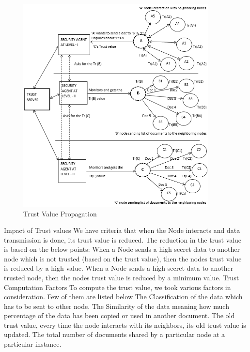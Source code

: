 \begin{figure}[h!]
    \label{fig:TrustTransmission}
    \begin{center}
        \includegraphics[width=0.90\textwidth]{Figures/Trust_Propagation_Diagram.PNG}
        \caption{Trust Value Propagation}
    \end{center}
\end{figure}


Impact of Trust values
We have criteria that when the Node interacts and data transmission is done, its trust value is reduced. The reduction in the trust value is based on the below points:
	When a Node sends a high secret data to another node which is not trusted (based on the trust value), then the nodes trust value is reduced by a high value.
	When a Node sends a high secret data to another trusted node, then the nodes trust value is reduced by a minimum value.
Trust Computation Factors
To compute the trust value, we took various factors in consideration. Few of them are listed below
	The Classification of the data which has to be sent to other node.
	The Similarity of the data meaning how much percentage of the data has been copied or used in another document.
	The old trust value, every time the node interacts with its neighbors, its old trust value is updated.
	The total number of documents shared by a particular node at a particular instance.

